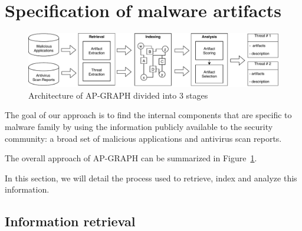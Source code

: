 \section{Specification of malware artifacts}

\begin{figure}[!ht]
        \centering
	\includegraphics[width=\linewidth]{figures/apgraph/overview.pdf}
        \caption[Architecture of AP-GRAPH]{Architecture of AP-GRAPH divided into 3 stages}
	\label{figure:apgraph:overview}
\end{figure}

The goal of our approach is to find the internal components that are specific to malware family by using the information publicly available to the security community: a broad set of malicious applications and antivirus scan reports.

The overall approach of AP-GRAPH can be summarized in Figure~\ref{figure:apgraph:overview}.

In this section, we will detail the process used to retrieve, index and analyze this information.
\subsection{Information retrieval}
